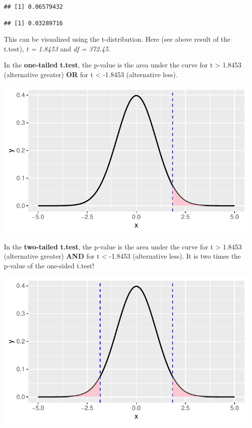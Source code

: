 \documentclass[
]{book}
\newenvironment{Shaded}{\begin{snugshade}}{\end{snugshade}}
\newcommand{\AttributeTok}[1]{\textcolor[rgb]{0.13,0.29,0.53}{#1}}
\newcommand{\CommentTok}[1]{\textcolor[rgb]{0.56,0.35,0.01}{\textit{#1}}}
\newcommand{\FunctionTok}[1]{\textcolor[rgb]{0.13,0.29,0.53}{\textbf{#1}}}
\newcommand{\NormalTok}[1]{#1}
\newcommand{\SpecialCharTok}[1]{\textcolor[rgb]{0.81,0.36,0.00}{\textbf{#1}}}
\newcommand{\StringTok}[1]{\textcolor[rgb]{0.31,0.60,0.02}{#1}}
\begin{document}
\begin{verbatim}
## [1] 0.06579432
\end{verbatim}

\begin{Shaded}
\end{Shaded}

\begin{verbatim}
## [1] 0.03289716
\end{verbatim}

This can be visualized using the t-distribution.
Here (see above result of the t.test), \emph{t = 1.8453} and \emph{df = 372.45}.

In the \textbf{one-tailed t.test}, the p-value is the area under the curve for t \textgreater{} 1.8453 (alternative greater) \textbf{OR} for t \textless{} -1.8453 (alternative less).

\includegraphics{_main_files/figure-latex/unnamed-chunk-128-1.pdf}

In the \textbf{two-tailed t.test}, the p-value is the area under the curve for t \textgreater{} 1.8453 (alternative greater) \textbf{AND} for t \textless{} -1.8453 (alternative less).
It is two times the p-value of the one-sided t.test!

\includegraphics{_main_files/figure-latex/unnamed-chunk-129-1.pdf}
\end{document}
